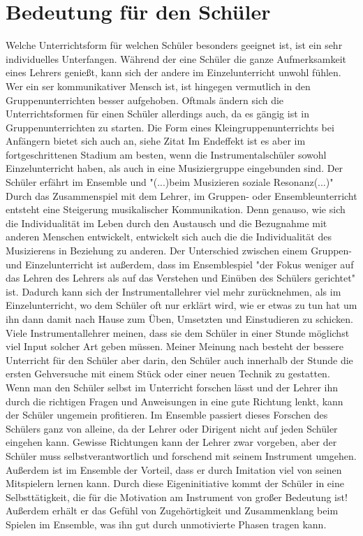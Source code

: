 \section{Bedeutung für den Schüler}
Welche Unterrichtsform für welchen Schüler besonders geeignet ist, ist ein sehr
individuelles Unterfangen. Während der eine Schüler die ganze Aufmerksamkeit
eines Lehrers genießt, kann sich der andere im Einzelunterricht unwohl fühlen.
Wer ein ser kommunikativer Mensch ist, ist hingegen vermutlich in den
Gruppenunterrichten besser aufgehoben. Oftmals ändern sich die Unterrichtsformen
für einen Schüler allerdings auch, da es gängig ist in Gruppenunterrichten zu
starten. Die Form eines Kleingruppenunterrichts bei Anfängern bietet sich auch
an, siehe Zitat \autocite[220]{busch:grundwissen_instrumentalpaedagogik}
Im Endeffekt ist es aber im fortgeschrittenen Stadium am besten, wenn die
Instrumentalschüler sowohl Einzelunterricht haben, als auch in eine
Musiziergruppe eingebunden sind. 
Der Schüler erfährt im Ensemble und "(...)beim Musizieren soziale Resonanz(...)" \autocite[28]{mitzscherlich:musikpsychologie}
Durch das Zusammenspiel mit dem Lehrer, im Gruppen- oder Ensembleunterricht
entsteht eine Steigerung musikalischer Kommunikation.
\autocite[99]{mitzscherlich:musikpsychologie} Denn genauso, wie sich die
Individualität im Leben durch den Austausch und die Bezugnahme mit anderen
Menschen entwickelt, entwickelt sich auch die die Individualität des Musizierens
in Beziehung zu anderen. 
Der Unterschied zwischen einem Gruppen- und Einzelunterricht ist außerdem, dass
im Ensemblespiel 
"der Fokus weniger auf das Lehren des Lehrers als auf das Verstehen und Einüben
des Schülers gerichtet" ist. \autocite[31]{losert:die_kunst_zu_unterrichten}
Dadurch kann sich der Instrumentallehrer viel mehr zurücknehmen, als im
Einzelunterricht, wo dem Schüler oft nur erklärt wird, wie er etwas zu tun hat
um ihn dann damit nach Hause zum Üben, Umsetzten und Einstudieren zu schicken.
Viele Instrumentallehrer meinen, dass sie dem Schüler in einer Stunde möglichst
viel Input solcher Art geben müssen. Meiner Meinung nach besteht der bessere
Unterricht für den Schüler aber darin, den Schüler auch innerhalb der Stunde die ersten
Gehversuche mit einem Stück oder einer neuen Technik zu gestatten. Wenn man den
Schüler selbst im Unterricht forschen lässt und der Lehrer ihn durch die
richtigen Fragen und Anweisungen in eine gute Richtung lenkt, kann der Schüler
ungemein profitieren. Im Ensemble passiert dieses Forschen des Schülers ganz von
alleine, da der Lehrer oder Dirigent nicht auf jeden Schüler eingehen kann.
Gewisse Richtungen kann der Lehrer zwar vorgeben, aber der Schüler muss
selbstverantwortlich und forschend mit seinem Instrument umgehen. Außerdem ist
im Ensemble der Vorteil, dass er durch Imitation viel von seinen Mitspielern
lernen kann. Durch diese Eigeninitiative kommt der Schüler in eine
Selbsttätigkeit, die für die Motivation am Instrument von großer Bedeutung ist!
Außerdem erhält
er das Gefühl von Zugehörtigkeit und Zusammenklang beim Spielen im Ensemble, was
ihn gut durch unmotivierte Phasen tragen kann.

